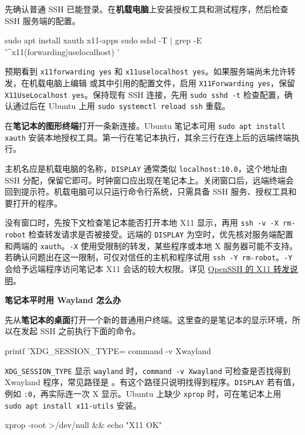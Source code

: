 \begin{example}[让机载电脑上的时钟显示在笔记本]
先确认普通 SSH 已能登录。在\textbf{机载电脑}上安装授权工具和测试程序，然后检查 SSH 服务端的配置。
\begin{tbash}
sudo apt install xauth x11-apps
sudo sshd -T | grep -E '^x11(forwarding|uselocalhost) '
\end{tbash}
预期看到 \texttt{x11forwarding yes} 和 \texttt{x11uselocalhost yes}。如果服务端尚未允许转发，在机载电脑上编辑  或其中引用的配置文件，启用 \texttt{X11Forwarding yes}，保留 \texttt{X11UseLocalhost yes}。保持现有 SSH 连接，先用 \texttt{sudo sshd -t} 检查配置，确认通过后在 Ubuntu 上用 \texttt{sudo systemctl reload ssh} 重载。

在\textbf{笔记本的图形终端}打开一条新连接。Ubuntu 笔记本可用 \texttt{sudo apt install xauth} 安装本地授权工具。第一行在笔记本执行，其余三行在连上后的远端终端执行。
主机名应是机载电脑的名称，\texttt{DISPLAY} 通常类似 \texttt{localhost:10.0}，这个地址由 SSH 分配，保留它即可。时钟窗口应出现在笔记本上。关闭窗口后，远端终端会回到提示符。机载电脑可以只运行命令行系统，只需具备 SSH 服务、授权工具和要打开的程序。
\end{example}

没有窗口时，先按下文检查笔记本能否打开本地 X11 显示，再用 \texttt{ssh -v -X rm-robot} 检查转发请求是否被接受。远端的 \texttt{DISPLAY} 为空时，优先核对服务端配置和两端的 \texttt{xauth}。\texttt{-X} 使用受限制的转发，某些程序或本地 X 服务器可能不支持。若确认问题出在这一限制，可仅对信任的主机和程序试用 \texttt{ssh -Y rm-robot}。\texttt{-Y} 会给予远端程序访问笔记本 X11 会话的较大权限。详见 \href{https://man.openbsd.org/ssh#X11_FORWARDING}{OpenSSH 的 X11 转发说明}。

\textbf{笔记本平时用 Wayland 怎么办}

先从\textbf{笔记本的桌面}打开一个新的普通用户终端。这里查的是笔记本的显示环境，所以在发起 SSH 之前执行下面的命令。
\begin{tbash}
printf 'XDG_SESSION_TYPE=%
command -v Xwayland
\end{tbash}
\texttt{XDG\_SESSION\_TYPE} 显示 \texttt{wayland} 时，\texttt{command -v Xwayland} 可检查是否找得到 Xwayland 程序，常见路径是 。有这个路径只说明找得到程序。\texttt{DISPLAY} 若有值，例如 \texttt{:0}，再实际连一次 X 显示。Ubuntu 上缺少 \texttt{xprop} 时，可在笔记本上用 \texttt{sudo apt install x11-utils} 安装。
\begin{tbash}
xprop -root >/dev/null && echo "X11 OK"
\end{tbash}


